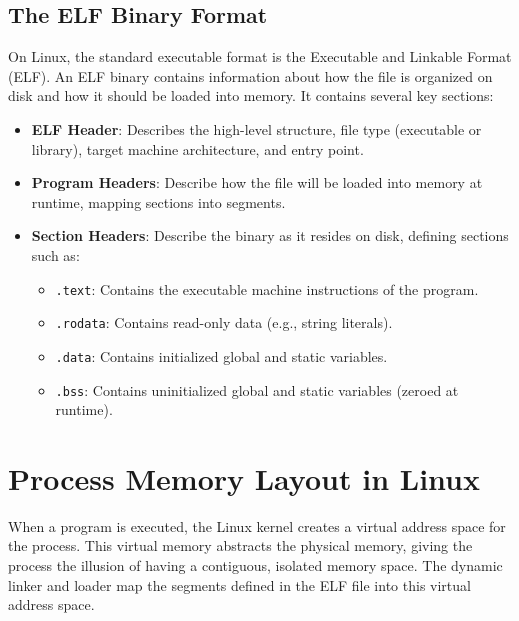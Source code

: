 \subsection{The ELF Binary Format}
On Linux, the standard executable format is the Executable and Linkable Format (ELF). An ELF binary contains information about how the file is organized on disk and how it should be loaded into memory. It contains several key sections:
\begin{itemize}
    \item \textbf{ELF Header}: Describes the high-level structure, file type (executable or library), target machine architecture, and entry point.
    \item \textbf{Program Headers}: Describe how the file will be loaded into memory at runtime, mapping sections into segments.
    \item \textbf{Section Headers}: Describe the binary as it resides on disk, defining sections such as:
    \begin{itemize}
        \item \texttt{.text}: Contains the executable machine instructions of the program.
        \item \texttt{.rodata}: Contains read-only data (e.g., string literals).
        \item \texttt{.data}: Contains initialized global and static variables.
        \item \texttt{.bss}: Contains uninitialized global and static variables (zeroed at runtime).
    \end{itemize}
\end{itemize}

\section{Process Memory Layout in Linux}
When a program is executed, the Linux kernel creates a virtual address space for the process. This virtual memory abstracts the physical memory, giving the process the illusion of having a contiguous, isolated memory space. The dynamic linker and loader map the segments defined in the ELF file into this virtual address space.


